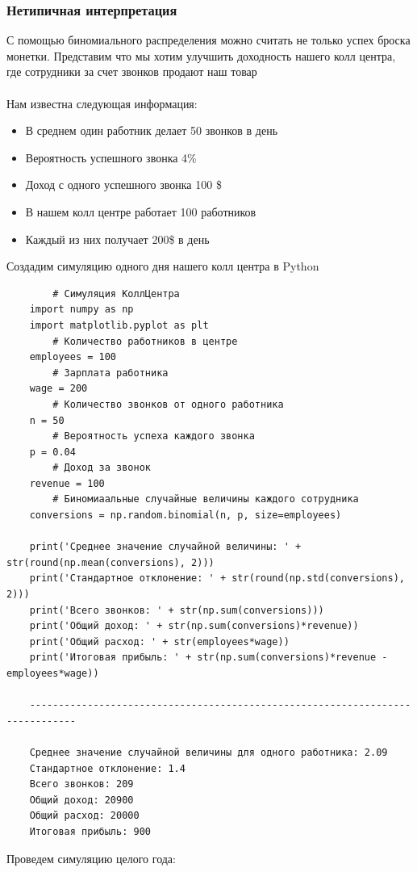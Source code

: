 \documentclass[a4paper]{article}
\begin{document}
\subsubsection{Нетипичная интерпретация}

С помощью биномиального распределения можно считать не только успех броска монетки. Представим что мы хотим улучшить доходность нашего колл центра, где сотрудники за счет звонков продают наш товар\citep{callcenter}\\ \\
Нам известна следующая информация:

\begin{itemize}
  \item В среднем один работник делает 50 звонков в день
  \item Вероятность успешного звонка 4\%
  \item Доход с одного успешного звонка 100 \$
  \item В нашем колл центре работает 100 работников
  \item Каждый из них получает 200\$ в день
\end{itemize}

Создадим симуляцию одного дня нашего колл центра в Python

\begin{verbatim}
        # Симуляция КоллЦентра
    import numpy as np
    import matplotlib.pyplot as plt 
        # Количество работников в центре
    employees = 100
        # Зарплата работника
    wage = 200
        # Количество звонков от одного работника
    n = 50
        # Вероятность успеха каждого звонка
    p = 0.04
        # Доход за звонок
    revenue = 100
        # Биномиаальные случайные величины каждого сотрудника
    conversions = np.random.binomial(n, p, size=employees)
    
    print('Среднее значение случайной величины: ' + str(round(np.mean(conversions), 2)))
    print('Стандартное отклонение: ' + str(round(np.std(conversions), 2)))
    print('Всего звонков: ' + str(np.sum(conversions)))
    print('Общий доход: ' + str(np.sum(conversions)*revenue))
    print('Общий расход: ' + str(employees*wage))
    print('Итоговая прибыль: ' + str(np.sum(conversions)*revenue - employees*wage))
    
    ------------------------------------------------------------------------------
    
    Среднее значение случайной величины для одного работника: 2.09
    Стандартное отклонение: 1.4
    Всего звонков: 209
    Общий доход: 20900
    Общий расход: 20000
    Итоговая прибыль: 900
\end{verbatim}
\newpage
    Проведем симуляцию целого года: 
\end{document}
